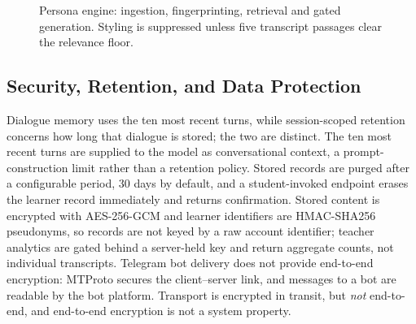 \documentclass[conference]{IEEEtran}
\begin{document}
\begin{figure}[!t]
\centering
{}
\caption{Persona engine: ingestion, fingerprinting, retrieval and gated
generation. Styling is suppressed unless five transcript passages clear the
relevance floor.}
\label{fig:persona}
\end{figure}

\subsection{Security, Retention, and Data Protection}
\label{sec:security}
Dialogue memory uses the ten most recent turns, while session-scoped retention
concerns how long that dialogue is stored; the two are distinct. The ten most
recent turns are supplied to the model as conversational context, a
prompt-construction limit rather than a retention policy. Stored records are
purged after a configurable period, $30$ days by default, and a student-invoked
endpoint erases the learner record immediately and returns confirmation. Stored
content is encrypted with AES-256-GCM and learner identifiers are HMAC-SHA256
pseudonyms, so records are not keyed by a raw account identifier; teacher
analytics are gated behind a server-held key and return aggregate counts, not
individual transcripts. Telegram bot delivery does not provide end-to-end
encryption: MTProto secures the client--server link, and messages to a bot are
readable by the bot platform. Transport is encrypted in transit, but \emph{not}
end-to-end, and end-to-end encryption is not a system property.
\end{document}
